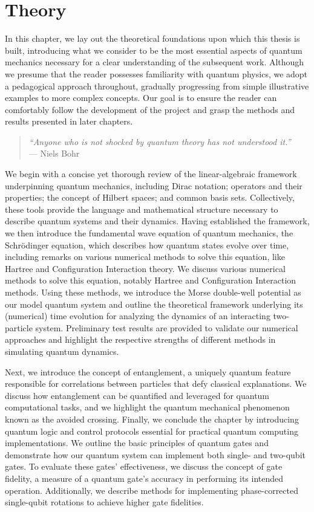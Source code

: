 \documentclass{subfiles}
\begin{document}
\chapter{Theory}\label{chap:2}
In this chapter, we lay out the theoretical foundations upon which this thesis is built, introducing what we consider to be the most essential aspects of quantum mechanics necessary for a clear understanding of the subsequent work. Although we presume that the reader possesses familiarity with quantum physics, we adopt a pedagogical approach throughout, gradually progressing from simple illustrative examples to more complex concepts. Our goal is to ensure the reader can comfortably follow the development of the project and grasp the methods and results presented in later chapters.

\begin{quote}
    \centering
    \textit{“Anyone who is not shocked by quantum theory has not understood it.”}\\
    \vspace{0.2cm}
    --- Niels Bohr
\end{quote}


We begin with a concise yet thorough review of the linear-algebraic framework underpinning quantum mechanics, including Dirac notation; operators and their properties; the concept of Hilbert spaces; and common basis sets. Collectively, these tools provide the language and mathematical structure necessary to describe quantum systems and their dynamics. Having established the framework, we then introduce the fundamental wave equation of quantum mechanics, the Schrödinger equation, which describes how quantum states evolve over time, including remarks on various numerical methods to solve this equation, like Hartree and Configuration Interaction theory. We discuss various numerical methods to solve this equation, notably Hartree and Configuration Interaction methods. Using these methods, we introduce the Morse double-well potential as our model quantum system and outline the theoretical framework underlying its (numerical) time evolution for analyzing the dynamics of an interacting two-particle system. Preliminary test results are provided to validate our numerical approaches and highlight the respective strengths of different methods in simulating quantum dynamics.

Next, we introduce the concept of entanglement, a uniquely quantum feature responsible for correlations between particles that defy classical explanations. We discuss how entanglement can be quantified and leveraged for quantum computational tasks, and we highlight the quantum mechanical phenomenon known as the avoided crossing.
Finally, we conclude the chapter by introducing quantum logic and control protocols essential for practical quantum computing implementations. We outline the basic principles of quantum gates and demonstrate how our quantum system can implement both single- and two-qubit gates. To evaluate these gates' effectiveness, we discuss the concept of gate fidelity, a measure of a quantum gate's accuracy in performing its intended operation. Additionally, we describe methods for implementing phase-corrected single-qubit rotations to achieve higher gate fidelities.
\end{document}
